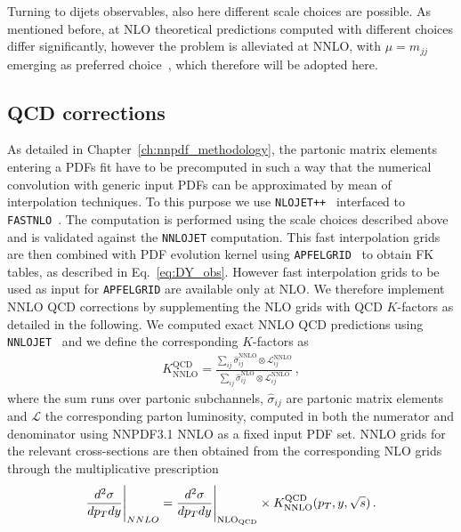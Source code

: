 %
Turning to dijets observables, also here different scale choices are possible. As mentioned before, at NLO theoretical predictions
computed with different choices differ significantly, however the problem is alleviated at NNLO, with $\mu = m_{jj}$
emerging as preferred choice~\cite{Currie:2017eqf,Currie:2018oxh}, which therefore will be adopted here. 

\subsection{QCD corrections}
As detailed in Chapter~\ref{ch:nnpdf_methodology}, the partonic matrix elements entering a PDFs fit
have to be precomputed in such a way that the numerical convolution with generic input PDFs can be approximated by mean
of interpolation techniques. 
To this purpose we use {\tt NLOJET++}~\cite{Nagy:2001fj} interfaced to {\tt F{\small AST}NLO}~\cite{Wobisch:2011ij}.
The computation is performed using the scale choices described above and is validated against the {\tt NNLOJET} computation.
This fast interpolation grids are then combined with PDF evolution kernel using {\tt APFEL{\small GRID}}~\cite{Bertone:2016lga}
to obtain FK tables, as described in Eq.~\ref{eq:DY_obs}.
However fast interpolation grids to be used as input for {\tt APFEL{\small GRID}} are available only at NLO.
We therefore implement NNLO QCD corrections by supplementing the NLO grids with QCD $K$-factors as detailed in the following.
We computed exact NNLO QCD predictions using {\tt NNLOJET}~\cite{Gehrmann-DeRidder:2019ibf} and we define the 
corresponding $K$-factors as
\begin{align}
    \label{eq:QCD_kfactors}
    K^{\text{QCD}}_{\text{NNLO}} = \frac{\sum_{ij}\hat{\sigma}_{ij}^{\text{NNLO}}\otimes \mathcal{L}_{ij}^{\text{NNLO}}}
    {\sum_{ij}\hat{\sigma}_{ij}^{\text{NLO}}\otimes \mathcal{L}_{ij}^{\text{NNLO}}}\,,
\end{align}
where the sum runs over partonic subchannels, $\hat{\sigma}_{ij}$ are partonic matrix elements and $\mathcal{L}$
the corresponding parton luminosity, computed in both the numerator and denominator using NNPDF3.1 NNLO as a fixed input 
PDF set.
NNLO grids for the relevant cross-sections are then obtained from the corresponding NLO grids through the multiplicative
prescription
\begin{align}
    \label{eq:NNLO_kfactors}
    \frac{d^2\sigma}{dp_T dy}\Bigg|_{NNLO} = \frac{d^2\sigma}{dp_T dy}
    \Bigg|_{\rm NLO_{QCD}} \times K_{\rm NNLO}^{\rm QCD}(p_T,y,\sqrt{s})\, .
\end{align}
